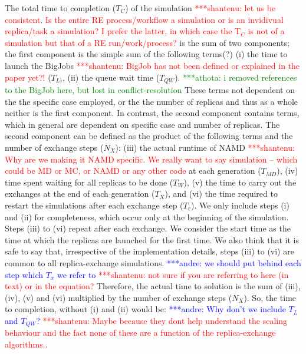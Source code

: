 \documentclass{rspublic}
\newcommand{\jhanote}[1]{ {\textcolor{red} { ***shantenu: #1 }}}
\newcommand{\alnote}[1]{ {\textcolor{blue} { ***andre: #1 }}}
\newcommand{\athotanote}[1]{ {\textcolor{green} { ***athota: #1 }}}
\newcommand{\alnote}[1]{}
\newcommand{\athotanote}[1]{}
\newcommand{\jhanote}[1]{}
\begin{document}
The total time to completion ($T_{C}$) of the simulation
\jhanote{let us be consistent. Is the entire RE process/workflow a
  simulation or is an invidivual replica/task a simulation? I prefer
  the latter, in which case the T$_C$ is not of a simulation but that
  of a RE run/work/process?}  is the sum of two components; the first
component is the simple sum of the following terms(?) (i) the time to
launch the BigJobs \jhanote{BigJob has not been defined or explained
  in the paper yet?!}  ($T_{L)}$, (ii) the queue wait time
($T_{QW}$). \athotanote{i removed references to the BigJob here, but lost in conflict-resolution}These terms not dependent on the the specific case
employed, or the the number of replicas and thus as a whole neither is
the first component. In contrast, the second component contains terms,
which in general are dependent on specific case and number of
replicas.  The second component can be defined as
the product of the following terms and the number of exchange steps
($N_{X}$): (iii) the actual runtime of NAMD \jhanote{Why are we making
  it NAMD specific. We really want to say simulation -- which could be
  MD or MC, or NAMD or any other code} at each generation ($T_{MD}$),
(iv) time spent waiting for all replicas to be done ($T_{W}$), (v) the
time to carry out the exchanges at the end of each generation
($T_{X}$), and (vi) the time required to restart the simulations after
each exchange step ($T_{r}$). We only include steps (i) and (ii) for
completeness, which occur only at the beginning of the
simulation. Steps (iii) to (vi) repeat after each exchange. We
consider the start time as the time at which the replicas are launched
for the first time. We also think that it is safe to say that,
irrespective of the implementation details, steps (iii) to (vi) are
common to all replica-exchange simulations. \alnote{we should put
  behind each step which $T_{x}$ we refer to} \jhanote{not sure if you
  are referring to here (in text) or in the equation?} Therefore, the
actual time to solution is the sum of (iii), (iv), (v) and (vi)
multiplied by the number of exchange steps ($N_{X}$). So, the time to
completion, without (i) and (ii) would be: \alnote{Why don't we
  include $T_{L}$ and $T_{QW}$?}  \jhanote{Maybe because they dont
  help understand the scaling behaviour and the fact none of these are
  a function of the replica-exchange algorithms..}
\end{document}
